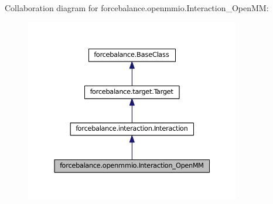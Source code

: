 Collaboration diagram for forcebalance.\-openmmio.\-Interaction\-\_\-\-Open\-M\-M\-:\nopagebreak
\begin{figure}[H]
\begin{center}
\leavevmode
\includegraphics[width=266pt]{classforcebalance_1_1openmmio_1_1Interaction__OpenMM__coll__graph}
\end{center}
\end{figure}

